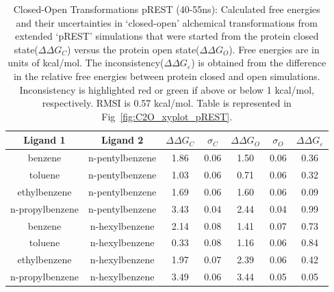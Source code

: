 \begin{table}[!htb]
\centering
\caption{Closed-Open Transformations pREST (40-55ns):
Calculated free energies and their uncertainties in `closed-open' alchemical transformations from extended `pREST' simulations that were started from the protein closed state(\boldmath$\Delta\Delta G_{C}$) versus the protein open state(\boldmath$\Delta\Delta G_{O}$). 
 Free energies are in units of kcal/mol. 
 The inconsistency(\boldmath$\Delta\Delta G_{\varepsilon}$) is obtained from the difference in the relative free energies between protein closed and open simulations. 
 Inconsistency is highlighted red or green if above or below 1 kcal/mol, respectively.
 RMSI is 0.57 kcal/mol.
 Table is represented in Fig~\ref{fig:C2O_xyplot_pREST}.
}
\label{tbl:C-O_pREST-40-55ns}
\begin{tabular}{|c|c|c|c|c|c|c|}
\hline
\textbf{Ligand 1}       & \textbf{Ligand 2}    & \boldmath$\Delta\Delta G_{C}$ & \boldmath$\sigma_{C}$ & \boldmath$\Delta\Delta G_{O}$ & \boldmath$\sigma_{O}$ & \boldmath$\Delta\Delta G_{\varepsilon}$ \\ \hline
benzene         & n-pentylbenzene & 1.86                                   & 0.06                       & 1.50                                & 0.06                       & \cellcolor[HTML]{9AFF99}0.36 \\ \hline
toluene         & n-pentylbenzene & 1.03                                   & 0.06                       & 0.71                                 & 0.06                       & \cellcolor[HTML]{9AFF99}0.32 \\ \hline
ethylbenzene    & n-pentylbenzene & 1.69                                   & 0.06                       & 1.60                                 & 0.06                       & \cellcolor[HTML]{9AFF99}0.09 \\ \hline
n-propylbenzene & n-pentylbenzene & 3.43                                   & 0.04                       & 2.44                                & 0.04                       & \cellcolor[HTML]{9AFF99}0.99 \\ \hline
benzene         & n-hexylbenzene  & 2.14                                   & 0.08                       & 1.41                                & 0.07                       & \cellcolor[HTML]{9AFF99}0.73 \\ \hline
toluene         & n-hexylbenzene  & 0.33                                   & 0.08                       & 1.16                                & 0.06                       & \cellcolor[HTML]{9AFF99}0.84 \\ \hline
ethylbenzene    & n-hexylbenzene  & 1.97                                   & 0.07                       & 2.39                                & 0.06                       & \cellcolor[HTML]{9AFF99}0.42 \\ \hline
n-propylbenzene & n-hexylbenzene  & 3.49                                   & 0.06                       & 3.44                                 & 0.05                       & \cellcolor[HTML]{9AFF99}0.05 \\ \hline
\end{tabular}
\end{table}


